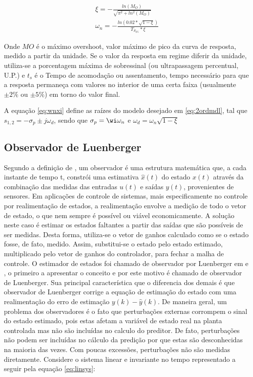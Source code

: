 \begin{equation} \label{eq:wnxi}
  \begin{split} 
    \xi=-\frac{ln\left( M_O \right)}{\sqrt{\pi^2+ln^2(M_O)}}\\
    \omega_n=-\frac{ln\left( 0.02*\sqrt{1-\xi} \right)}{T_{S_{2\%}}*\xi} 
  \end{split}
\end{equation}
  
Onde $MO$ é o máximo overshoot, valor máximo de pico da curva de resposta, medido a partir da unidade. Se o valor da resposta em regime diferir da unidade, utiliza-se a porcentagem máxima de sobressinal (ou ultrapassagem percentual, U.P.) e $t_s$ é o Tempo de acomodação ou assentamento, tempo necessário para que a resposta permaneça com valores no interior de uma certa faixa (usualmente $\pm2\%$ ou $\pm5\%$) em torno do valor final.

A equação \eqref{eq:wnxi} define as raízes do modelo desejado em \eqref{eq:2ordmdl}, tal que $s_{1,2}=-\sigma_p ±j\omega_d$, sendo que $\sigma_p = \wi\omega_n$ e $\omega_{d}=\omega_{n} \sqrt{1-\xi}$ 
 
\subsection{Observador de Luenberger}\label{sc:luemberger}
Segundo a definição de \cite{EllisObserver}, um observador é uma estrutura matemática que, a cada instante de tempo t, constrói uma estimativa $\hat{x}(t)$ do estado $x(t)$ através da combinação das medidas das entradas $u(t)$ e saídas $y(t)$, provenientes de sensores. Em aplicações de controle de sistemas, mais especificamente no controle por realimentação de estados, a realimentação envolve a medição de todo o vetor de estado, o que nem sempre é possível ou viável economicamente. A solução neste caso é estimar os estados faltantes a partir das saídas que são possíveis de ser medidas. Desta forma, utiliza-se o vetor de ganhos calculado como se o estado fosse, de fato, medido. Assim, substitui-se o estado pelo estado estimado, multiplicado pelo vetor de ganhos do controlador, para fechar a malha de controle.
O estimador de estados foi chamado de observador por Luenberger em \cite{Luenberger1971AnObservers} e \cite{Luenberger}, o primeiro a apresentar o conceito e por este motivo é chamado de observador de Luenberger. Sua principal característica que o diferencia dos demais é que observador de Luenberger corrige a equação de estimação do estado com uma realimentação do erro de estimação $y(k)-\hat{y}(k)$.
De maneira geral, um problema dos observadores é o fato que perturbações externas corrompem o sinal do estado estimado, pois estas afetam a variável de estado real na planta controlada mas não são incluídas no calculo do preditor. De fato, perturbações não podem ser incluídas no cálculo da predição por que estas são desconhecidas na maioria das vezes. Com poucas excessões, perturbações não são medidas diretamente.
Considere o sistema linear e invariante no tempo representado a seguir pela equação \eqref{eq:linsys}:

